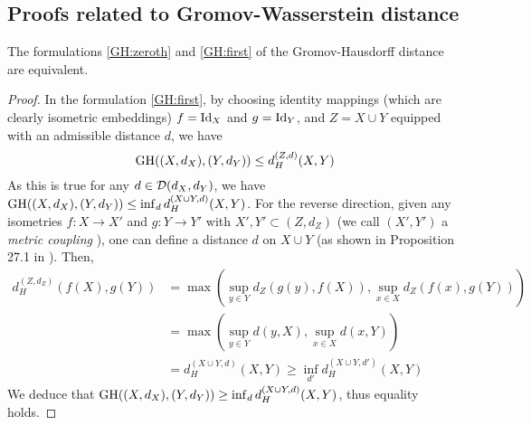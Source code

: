\subsection{Proofs related to Gromov-Wasserstein distance} \label{subsec:appendix_gw}

\begin{corollary}
    The formulations \eqref{GH:zeroth} and \eqref{GH:first} of the Gromov-Hausdorff distance
    are equivalent.
\end{corollary}
\begin{proof}
In the formulation \eqref{GH:first}, by choosing identity mappings (which are clearly isometric embeddings)
$f = \text{Id}_X$ and $g = \text{Id}_Y$, and $Z = X \cup Y$ equipped with an admissible distance $d$, we have
\begin{equation}
  \text{GH}((X,d_X), (Y,d_Y)) \leq d_{H}^{(Z,d)}(X, Y)
\end{equation}
As this is true for any $d \in \mathcal D(d_X,d_Y)$, we have
$\text{GH}((X,d_X), (Y,d_Y)) \leq \inf_{d} d_{H}^{(X \cup Y, d)}(X, Y)$. For the reverse direction,
given any isometries $f: X \to X'$ and $g: Y \to Y'$ with $X', Y' \subset (Z, d_Z)$
(we call $(X',Y')$ a \textit{metric coupling} \citep{Villani08}), one can define
a distance $d$ on $X \cup Y$ (as shown in Proposition 27.1 in \citep{Villani08}). Then,
\begin{equation}
  \begin{split}
    d_H^{(Z, d_Z)}(f(X), g(Y)) &=
  \max(\sup_{y \in Y} d_Z(g(y), f(X)), \sup_{x \in X} d_Z(f(x), g(Y))) \\
  &= \max(\sup_{y \in Y} d(y, X), \sup_{x \in X} d(x, Y)) \\
  &= d_H^{(X \cup Y, d)}(X, Y) \geq \inf_{d'} d_{H}^{(X \cup Y, d')}(X, Y)
  \end{split}
\end{equation}
We deduce that $\text{GH}((X,d_X), (Y,d_Y)) \geq \inf_{d} d_{H}^{(X \cup Y, d)}(X, Y)$,
thus equality holds.
\end{proof}

